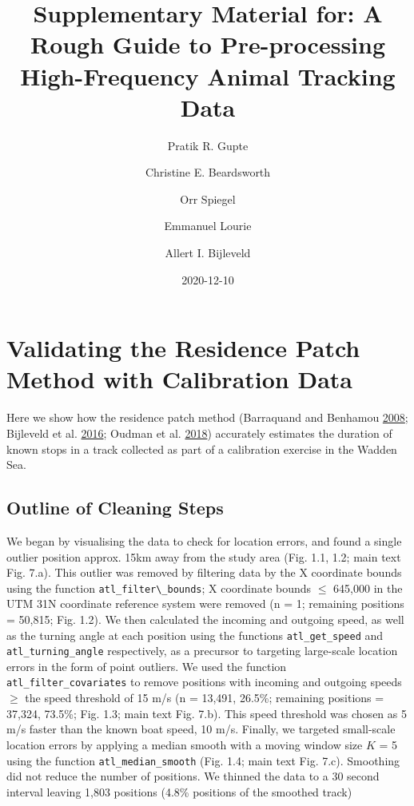 \documentclass[]{scrreprt}
\title{Supplementary Material for: A Rough Guide to Pre-processing High-Frequency Animal Tracking Data}
\author{Pratik R. Gupte \and Christine E. Beardsworth \and Orr Spiegel \and Emmanuel Lourie \and Allert I. Bijleveld}
\date{2020-12-10}
\begin{document}
\maketitle

{
\setcounter{tocdepth}{1}
\tableofcontents
}
\hypertarget{validating-the-residence-patch-method-with-calibration-data}{%
\chapter{Validating the Residence Patch Method with Calibration Data}\label{validating-the-residence-patch-method-with-calibration-data}}

Here we show how the residence patch method (Barraquand and Benhamou \protect\hyperlink{ref-barraquand2008}{2008}; Bijleveld et al. \protect\hyperlink{ref-bijleveld2016}{2016}; Oudman et al. \protect\hyperlink{ref-oudman2018}{2018}) accurately estimates the duration of known stops in a track collected as part of a calibration exercise in the Wadden Sea.

\hypertarget{outline-of-cleaning-steps}{%
\section{Outline of Cleaning Steps}\label{outline-of-cleaning-steps}}

We began by visualising the data to check for location errors, and found a single outlier position approx. 15km away from the study area (Fig. 1.1, 1.2; main text Fig. 7.a).
This outlier was removed by filtering data by the X coordinate bounds using the function \texttt{atl\_filter\textbackslash{}\_bounds}; X coordinate bounds \(\leq\) 645,000 in the UTM 31N coordinate reference system were removed (n = 1; remaining positions = 50,815; Fig. 1.2).
We then calculated the incoming and outgoing speed, as well as the turning angle at each position using the functions \texttt{atl\_get\_speed} and \texttt{atl\_turning\_angle} respectively, as a precursor to targeting large-scale location errors in the form of point outliers.
We used the function \texttt{atl\_filter\_covariates} to remove positions with incoming and outgoing speeds \(\geq\) the speed threshold of 15 m/s (n = 13,491, 26.5\%; remaining positions = 37,324, 73.5\%; Fig. 1.3; main text Fig. 7.b).
This speed threshold was chosen as 5 m/s faster than the known boat speed, 10 m/s.
Finally, we targeted small-scale location errors by applying a median smooth with a moving window size \(K\) = 5 using the function \texttt{atl\_median\_smooth} (Fig. 1.4; main text Fig. 7.c).
Smoothing did not reduce the number of positions.
We thinned the data to a 30 second interval leaving 1,803 positions (4.8\% positions of the smoothed track)
\end{document}
